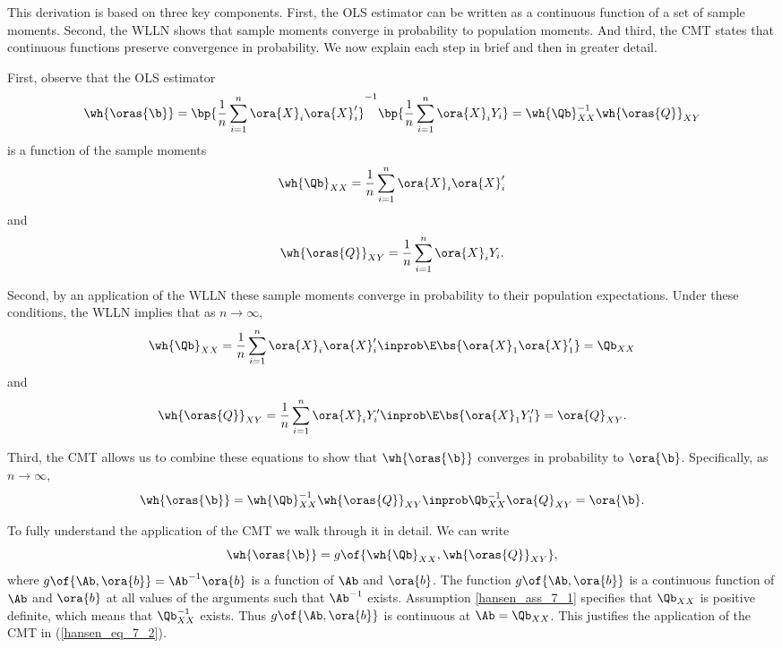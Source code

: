 This derivation is based on three key components. First, the OLS estimator can be written as a continuous function of a set of sample moments. Second, the WLLN shows that sample moments converge in probability to population moments. And third, the CMT states that continuous functions preserve convergence in probability. We now explain each step in brief and then in greater detail.

First, observe that the OLS estimator
\begin{equation}
    \notag
    \wh{\oras{\b}} = \bp{\frac{1}{n} \sum_{i=1}^n \ora{X}_i \ora{X}_i^\prime}^{-1} \bp{\frac{1}{n} \sum_{i=1}^n \ora{X}_i Y_i} = \wh{\Qb}_{XX}^{-1} \wh{\oras{Q}}_{XY}
\end{equation}
is a function of the sample moments 
$$\wh{\Qb}_{XX} = \frac{1}{n} \sum_{i=1}^n \ora{X}_i \ora{X}_i^\prime$$ 
and 
$$\wh{\oras{Q}}_{XY} = \frac{1}{n} \sum_{i=1}^n \ora{X}_i Y_i.$$

Second, by an application of the WLLN these sample moments converge in probability to their population expectations.  Under these conditions, the WLLN implies that as $n \rightarrow \infty$,
\begin{equation}
    \label{hansen_eq_7_1}
    \wh{\Qb}_{XX} = \frac{1}{n} \sum_{i=1}^n \ora{X}_i \ora{X}_i^\prime \inprob \E\bs{\ora{X}_1 \ora{X}_1^\prime} = \Qb_{XX}
\end{equation}
and 
\begin{equation}
    \notag
    \wh{\oras{Q}}_{XY} = \frac{1}{n} \sum_{i=1}^n \ora{X}_i Y_i^\prime \inprob \E\bs{\ora{X}_1 Y_1^\prime} = \ora{Q}_{XY}.
\end{equation}

Third, the CMT allows us to combine these equations to show that $\wh{\oras{\b}}$ converges in probability to $\ora{\b}$. Specifically, as $n \rightarrow \infty$,
\begin{equation}
    \label{hansen_eq_7_2}
    \wh{\oras{\b}} = \wh{\Qb}_{XX}^{-1} \wh{\oras{Q}}_{XY} \inprob \Qb_{XX}^{-1}\ora{Q}_{XY} = \ora{\b}.
\end{equation}

To fully understand the application of the CMT we walk through it in detail. We can write 
\begin{equation}
    \notag
    \wh{\oras{\b}} = g\of{\wh{\Qb}_{XX}, \wh{\oras{Q}}_{XY}},
\end{equation}
where $g\of{\Ab, \ora{b}} = \Ab^{-1}\ora{b}$ is a function of $\Ab$ and $\ora{b}$. The function  $g\of{\Ab, \ora{b}}$ is a continuous function of $\Ab$ and $\ora{b}$ at all values of the arguments such that $\Ab^{-1}$ exists. Assumption \ref{hansen_ass_7_1} specifies that $\Qb_{XX}$ is positive definite, which means that $\Qb_{XX}^{-1}$ exists. Thus $g\of{\Ab, \ora{b}}$ is continuous at $\Ab = \Qb_{XX}$. This justifies the application of the CMT in (\ref{hansen_eq_7_2}).

